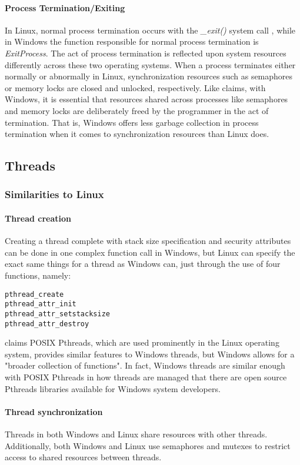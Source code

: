 \documentclass[letterpaper,10pt,titlepage]{article}
\begin{document}
\paragraph{Process Termination/Exiting}
In Linux, normal process termination occurs with the \emph{\_exit()} system call \cite{ker10}, while in Windows the function responsible for normal process termination is \emph{ExitProcess}.  The act of process termination is reflected upon system resources differently across these two operating systems. When a process terminates either normally or abnormally in Linux, synchronization resources such as semaphores or memory locks are closed and unlocked, respectively. Like \cite{har04} claims, with Windows, it is essential that resources shared across processes like semaphores and memory locks are deliberately freed by the programmer in the act of termination. That is, Windows offers less garbage collection in process termination when it comes to synchronization resources than Linux does. 

\subsection{Threads}
\subsubsection{Similarities to Linux}
\paragraph{Thread creation}
Creating a thread complete with stack size specification and security attributes can be done in one complex function call in Windows, but Linux can specify the exact same things for a thread as Windows can, just through the use of four functions, namely:
\begin{lstlisting}
pthread_create
pthread_attr_init
pthread_attr_setstacksize
pthread_attr_destroy
\end{lstlisting}
\cite{har04} claims POSIX Pthreads, which are used prominently in the Linux operating system, provides similar features to Windows threads, but Windows allows for a "broader collection of functions". In fact, Windows threads are similar enough with POSIX Pthreads in how threads are managed that there are open source Pthreads libraries available for Windows system developers.
\paragraph{Thread synchronization}
Threads in both Windows and Linux share resources with other threads. Additionally, both Windows and Linux use semaphores and mutexes to restrict access to shared resources between threads.
\end{document}

